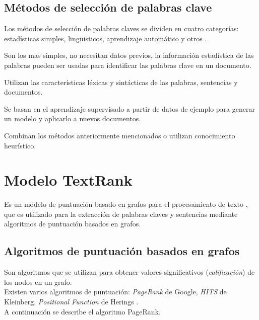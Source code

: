 \subsection{M\'etodos de selecci\'on de palabras clave}
Los m\'etodos de selecci\'on de palabras claves se dividen en cuatro categor\'ias:
estad\'isticas simples, ling\"uisticos, aprendizaje autom\'atico y otros \cite{ZWW08}.
\begin{description}[leftmargin=0cm]
	\item[Enfoques estad\'isticos] Son los mas simples, no necesitan datos previos,
	la informaci\'on estad\'istica de las palabras pueden ser usadas para identificar
	las palabras clave en un documento.
	\item[Enfoques ling\"uisticos] Utilizan las caracter\'isticas l\'exicas y
	sint\'acticas de las palabras, sentencias y documentos.
	\item[Enfoques de aprendizaje autom\'atico] Se basan en el aprendizaje supervisado
	a partir de datos de ejemplo para generar un modelo y aplicarlo a nuevos
	documentos.
	\item[Otros enfoques] Combinan los m\'etodos anteriormente mencionados o utilizan
	conocimiento heur\'istico.
\end{description}

\section{Modelo TextRank}
Es un m\'odelo de puntuaci\'on basado en grafos para el procesamiento de
texto \cite{RMPT04}, que es utilizado para la extracci\'on de palabras claves
y sentencias mediante algoritmos de puntuaci\'on basados en grafos.

\subsection{Algoritmos de puntuaci\'on basados en grafos}
Son algoritmos que se utilizan para obtener valores significativos
(\emph{calificaci\'on}) de los nodos en un grafo. \\

Existen varios algoritmos de puntuaci\'on: \emph{PageRank} de Google,
\emph{HITS} de Kleinberg, \emph{Positional Function} de Herings \cite{RM04}. \\

A continuaci\'on se describe el algoritmo PageRank.

